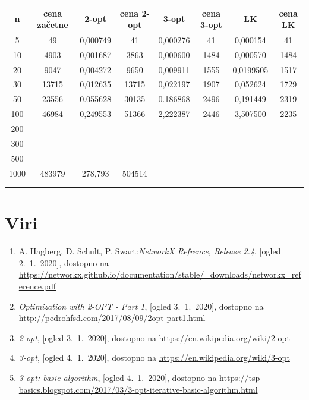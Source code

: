 \documentclass[12pt, a4paper]{article}
\begin{document}
\begin{table}[]
\begin{tabular}{|c|c|c|c|c|c|c|c|}
\hline
n&cena začetne&2-opt&cena 2-opt&3-opt&cena 3-opt&LK&cena LK\\\hline
5&49&0,000749&41&0,000276&41&0,000154&41\\\hline
10&4903&0,001687&3863&0,000600&1484&0,000570&1484\\\hline
20&9047&0,004272&9650&0,009911&1555&0,0199505&1517\\\hline
30&13715&0,012635&13715&0,022197&1907&0,052624&1729\\\hline
50&23556&0.055628&30135&0.186868&2496&0,191449&2319\\\hline
100&46984&0,249553&51366&2,222387&2446&3,507500&2235\\\hline
200&&&&&&&\\\hline
300&&&&&&&\\\hline
500&&&&&&&\\\hline
1000&483979&278,793&504514&&&&\\\hline
&&&&&&&\\\hline
&&&&&&&\\\hline
\end{tabular}
\end{table}


\newpage
\section[Viri]{Viri}

\begin{enumerate}

\item A. Hagberg, D. Schult, P. Swart:\emph{NetworkX Refrence, Release 2.4}, [ogled 2.~1.~2020], dostopno na \url{https://networkx.github.io/documentation/stable/_downloads/networkx_reference.pdf}

\item \emph{Optimization with 2-OPT - Part 1}, [ogled 3.~1.~2020], dostopno na \url{http://pedrohfsd.com/2017/08/09/2opt-part1.html}

\item \emph{2-opt}, [ogled 3.~1.~2020], dostopno na \url{https://en.wikipedia.org/wiki/2-opt}

\item \emph{3-opt}, [ogled 4.~1.~2020], dostopno na \url{https://en.wikipedia.org/wiki/3-opt}

\item \emph{3-opt: basic algorithm}, [ogled 4.~1.~2020], dostopno na \url{https://tsp-basics.blogspot.com/2017/03/3-opt-iterative-basic-algorithm.html}
\end{enumerate}
\end{document}
